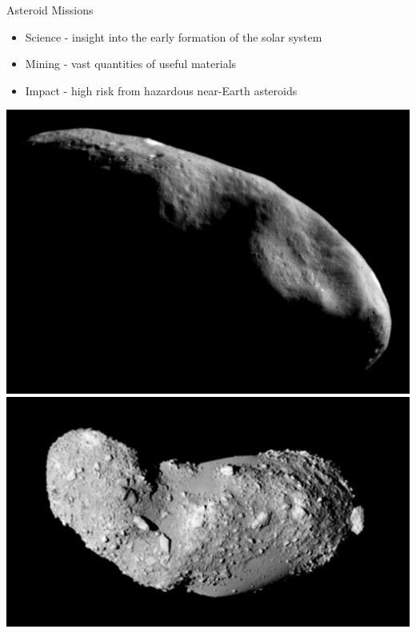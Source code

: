 \documentclass[11pt,professionalfonts]{beamer}
\begin{document}
\begin{frame}{Asteroid Missions}
\begin{itemize}
    \item Science - insight into the early formation of the solar system
    \item Mining - vast quantities of useful materials
    \item Impact - high risk from hazardous near-Earth asteroids
\end{itemize}    

\begin{center}
    \includegraphics[height=0.35\textheight]{figures/2016AAS/near_mos_20001203_full.jpg}
    \hfill
    \includegraphics[height=0.35\textheight]{figures/2016AAS/Itokawa8_hayabusa_1210.jpg}
\end{center}
\end{frame}
\end{document}
